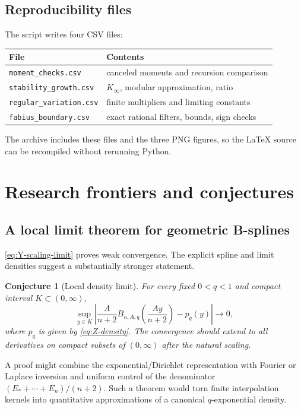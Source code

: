 \documentclass[11pt,oneside]{article}
\numberwithin{equation}{section}
\newtheorem{conjecture}[conjecture]{Conjecture}
\theoremstyle{definition}
\theoremstyle{remark}
\begin{document}
\subsection{Reproducibility files}

The script writes four CSV files:
\begin{center}
\begin{tabular}{ll}
\toprule
File & Contents\\
\midrule
\texttt{moment\_checks.csv} & canceled moments and recursion comparison\\
\texttt{stability\_growth.csv} & $K_\infty$, modular approximation, ratio\\
\texttt{regular\_variation.csv} & finite multipliers and limiting constants\\
\texttt{fabius\_boundary.csv} & exact rational filters, bounds, sign checks\\
\bottomrule
\end{tabular}
\end{center}
The archive includes these files and the three PNG figures, so the LaTeX source
can be recompiled without rerunning Python.

\section{Research frontiers and conjectures}
\label{sec:frontiers}

\subsection{A local limit theorem for geometric B-splines}

\cref{eq:Y-scaling-limit} proves weak convergence.  The explicit spline and
limit densities suggest a substantially stronger statement.

\begin{conjecture}[Local density limit]
For every fixed $0<q<1$ and compact interval $K\subset(0,\infty)$,
\begin{equation}
 \sup_{y\in K}
 \left|
 \frac{A}{n+2}B_{n,A,q}\!\left(\frac{Ay}{n+2}\right)-p_q(y)
 \right|\longrightarrow0,
 \label{eq:local-density-conjecture}
\end{equation}
where $p_q$ is given by \eqref{eq:Z-density}.  The convergence should extend to
all derivatives on compact subsets of $(0,\infty)$ after the natural scaling.
\end{conjecture}

A proof might combine the exponential/Dirichlet representation with Fourier or
Laplace inversion and uniform control of the denominator
$(E_*+\cdots+E_n)/(n+2)$.  Such a theorem would turn finite interpolation
kernels into quantitative approximations of a canonical $q$-exponential
density.
\end{document}
